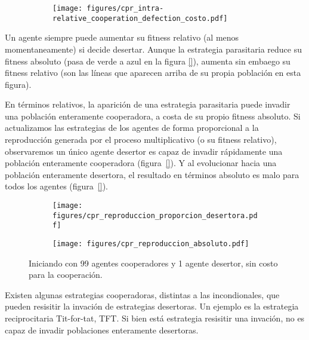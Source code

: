 \documentclass[a4paper,10pt]{article}
\begin{document}
\begin{figure}[H]
    \centering
    \begin{subfigure}[b]{0.45\textwidth}
    \texttt{[image: figures/cpr\_intra-relative\_cooperation\_defection\_costo.pdf]}
    \end{subfigure}
    \caption{}
    \label{fig:intra-relative}
\end{figure}

Un agente siempre puede aumentar su fitness relativo (al menos momentaneamente) si decide desertar.
Aunque la estrategia parasitaria reduce su fitness absoluto (pasa de verde a azul en la figura \ref{}), aumenta sin embaego su fitness relativo (son las líneas que aparecen arriba de su propia población en esta figura).


En términos relativos, la aparición de una estrategia parasitaria puede invadir una población enteramente cooperadora, a costa de su propio fitness absoluto.
Si actualizamos las estrategias de los agentes de forma proporcional a la reproducción generada por el proceso multiplicativo (o su fitness relativo), observaremos un único agente desertor es capaz de invadir rápidamente una población enteramente cooperadora (figura~\ref{}).
Y al evolucionar hacia una población enteramente desertora, el resultado en términos absoluto es malo para todos los agentes (figura~\ref{}).

\begin{figure}[H]
    \centering
    \begin{subfigure}[b]{0.45\textwidth}
    \texttt{[image: figures/cpr\_reproduccion\_proporcion\_desertora.pdf]}
    \end{subfigure}
    \begin{subfigure}[b]{0.45\textwidth}
    \texttt{[image: figures/cpr\_reproduccion\_absoluto.pdf]}
    \end{subfigure}
    \caption{Iniciando con 99 agentes cooperadores y 1 agente desertor, sin costo para la cooperación.}
    \label{fig:cpr_cooperation_zoom}
\end{figure}


Existen algunas estrategias cooperadoras, distintas a las incondionales, que pueden resisitir la invación de estrategias desertoras.
Un ejemplo es la estrategia reciprocitaria Tit-for-tat, TFT.
Si bien está estrategia resisitir una invación, no es capaz de invadir poblaciones enteramente desertoras.
\end{document}
